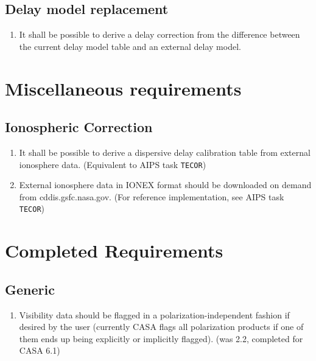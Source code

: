 \documentclass[11pt,a4paper]{article}
\begin{document}
\subsection{Delay model replacement}

\begin{enumerate}[subseclist]

\item It shall be possible to derive a delay correction from the
  difference between the current delay model table and an external
  delay model.

\end{enumerate}


\section{Miscellaneous requirements}

\subsection{Ionospheric Correction}

\begin{enumerate}[subseclist]

\item It shall be possible to derive a dispersive delay calibration
  table from external ionosphere data. (Equivalent to AIPS task
  \texttt{TECOR})

\item External ionosphere data in IONEX format should be downloaded on
  demand from cddis.gsfc.nasa.gov. (For reference implementation, see
  AIPS task \texttt{TECOR})

\end{enumerate}


\appendix

\section{Completed Requirements}

\subsection{Generic}

\begin{enumerate}[subseclist]

\item Visibility data should be flagged in a polarization-independent
  fashion if desired by the user (currently CASA flags all
  polarization products if one of them ends up being explicitly or
  implicitly flagged).  (was 2.2, completed for CASA 6.1)

\end{enumerate}
\end{document}
